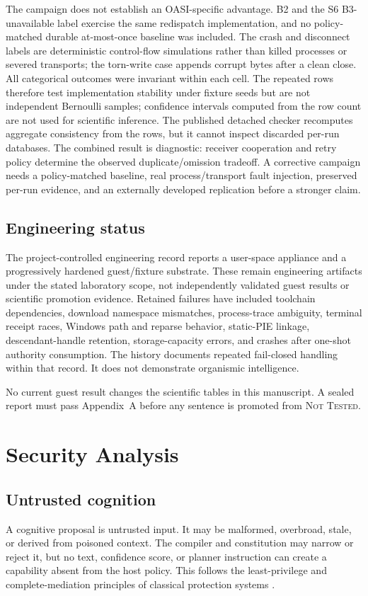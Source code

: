 \documentclass[journal,10pt]{IEEEtran}
\newcommand{\NotTested}{\textsc{Not Tested}}
\begin{document}
The campaign does not establish an OASI-specific advantage. B2 and the S6 B3-unavailable label exercise the same redispatch implementation, and no policy-matched durable at-most-once baseline was included. The crash and disconnect labels are deterministic control-flow simulations rather than killed processes or severed transports; the torn-write case appends corrupt bytes after a clean close. All categorical outcomes were invariant within each cell. The repeated rows therefore test implementation stability under fixture seeds but are not independent Bernoulli samples; confidence intervals computed from the row count are not used for scientific inference. The published detached checker recomputes aggregate consistency from the rows, but it cannot inspect discarded per-run databases. The combined result is diagnostic: receiver cooperation and retry policy determine the observed duplicate/omission tradeoff. A corrective campaign needs a policy-matched baseline, real process/transport fault injection, preserved per-run evidence, and an externally developed replication before a stronger claim.

\subsection{Engineering status}
The project-controlled engineering record reports a user-space appliance and a progressively hardened guest/fixture substrate. These remain engineering artifacts under the stated laboratory scope, not independently validated guest results or scientific promotion evidence. Retained failures have included toolchain dependencies, download namespace mismatches, process-trace ambiguity, terminal receipt races, Windows path and reparse behavior, static-PIE linkage, descendant-handle retention, storage-capacity errors, and crashes after one-shot authority consumption. The history documents repeated fail-closed handling within that record. It does not demonstrate organismic intelligence.

No current guest result changes the scientific tables in this manuscript. A sealed report must pass Appendix~A before any sentence is promoted from \NotTested{}.

\section{Security Analysis}
\subsection{Untrusted cognition}
A cognitive proposal is untrusted input. It may be malformed, overbroad, stale, or derived from poisoned context. The compiler and constitution may narrow or reject it, but no text, confidence score, or planner instruction can create a capability absent from the host policy. This follows the least-privilege and complete-mediation principles of classical protection systems \cite{saltzer1975protection}.
\end{document}
